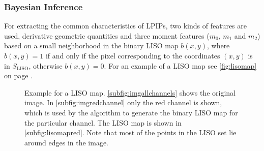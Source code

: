\subsubsection{Bayesian Inference}
\label{subsubsec:naivebayes}
For extracting the common characteristics of LPIPs, two kinds of features are used, derivative geometric quantities and three moment features ($m_0$, $m_1$ and $m_2$) based on a small neighborhood in the binary LISO map $b(x,y)$, where $b(x,y) = 1$ if and only if the pixel corresponding to the coordinates $(x,y)$ is in $S_\text{LISO}$, otherwise $b(x,y) = 0$. For an example of a LISO map see \autoref{fig:lisomap} on page \pageref{fig:lisomap}. 
\begin{figure}[htbp]
  \centering
  \caption[Example for a LISO map]{Example for a LISO map. \autoref{subfig:imgallchannels} shows the original image. In \autoref{subfig:imgredchannel} only the red channel is shown, which is used by the algorithm to generate the binary LISO map for the particular channel. The LISO map is shown in \autoref{subfig:lisomapred}. Note that most of the points in the LISO set lie around edges in the image.}
  \label{fig:lisomap}
\end{figure}
